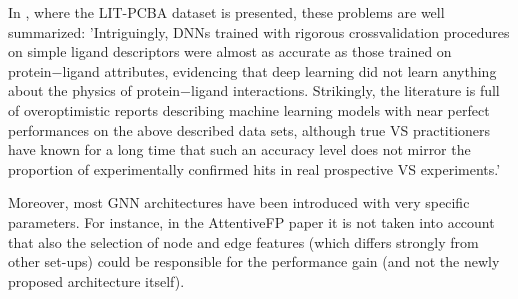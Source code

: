 In \cite{TranNguyen.2020}, where the LIT-PCBA dataset is presented, these problems are well summarized:
'Intriguingly, DNNs trained with rigorous crossvalidation procedures on simple ligand descriptors were almost as accurate as those trained on protein−ligand attributes, evidencing that deep learning did not learn anything about the physics of protein−ligand interactions. Strikingly, the literature is full of overoptimistic reports describing machine learning models with near perfect performances on the above described data sets, although true VS practitioners have known for a long time that such an accuracy level does not mirror the proportion of experimentally confirmed hits in real prospective VS experiments.' \cite{TranNguyen.2020}


Moreover, most GNN architectures have been introduced with very specific parameters. For instance, in the AttentiveFP paper it is not taken into account that also the selection of node and edge features (which differs strongly from other set-ups) could be responsible for the performance gain (and not the newly proposed architecture itself).